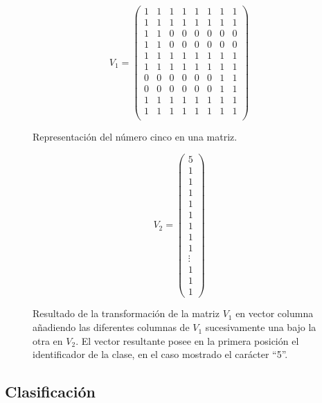 \begin{figure}[H]
  \begin{center}
    \[
    V_1 =
    \begin{pmatrix}
      1 & 1 & 1 & 1 & 1 & 1 & 1 & 1\\
      1 & 1 & 1 & 1 & 1 & 1 & 1 & 1\\
      1 & 1 & 0 & 0 & 0 & 0 & 0 & 0\\ 
      1 & 1 & 0 & 0 & 0 & 0 & 0 & 0\\ 
      1 & 1 & 1 & 1 & 1 & 1 & 1 & 1\\    
      1 & 1 & 1 & 1 & 1 & 1 & 1 & 1\\
      0 & 0 & 0 & 0 & 0 & 0 & 1 & 1\\ 
      0 & 0 & 0 & 0 & 0 & 0 & 1 & 1\\
      1 & 1 & 1 & 1 & 1 & 1 & 1 & 1\\
      1 & 1 & 1 & 1 & 1 & 1 & 1 & 1\\
    \end{pmatrix}
    \]
    \caption{Representación del número cinco en una matriz.}
    \label{fig:representacion-cinco}
  \end{center}
\end{figure}

\begin{figure}[H]
  \begin{center}
    \[
    V_2 =
    \begin{pmatrix}
      5 \\ 1 \\ 1 \\ 1 \\ 1 \\ 1 \\ 1 \\ 1 \\ 1\\ \vdots\\ 1 \\ 1 \\ 1
    \end{pmatrix}
    \]
    \caption{Resultado de la transformación de la matriz $V_1$ en vector columna añadiendo las diferentes columnas de $V_1$ sucesivamente una bajo la otra en $V_2$. El vector resultante posee en la primera posición el identificador de la clase, en el caso mostrado el carácter ``5''.}
    \label{fig:representacion-columna-cinco}
  \end{center}
\end{figure}

\subsection{Clasificación}

